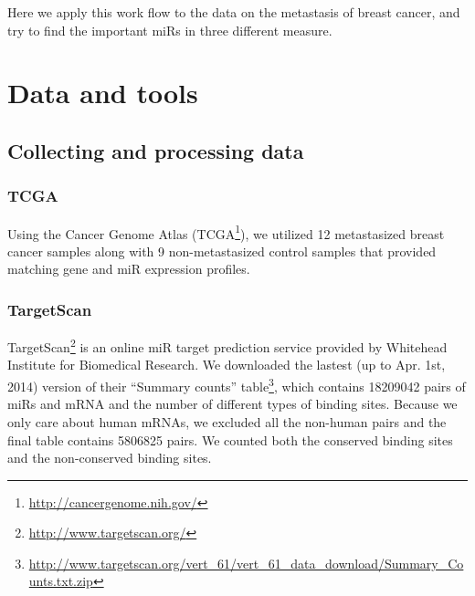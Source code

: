 \documentclass{scrartcl}
\numberwithin{figure}{section}
\numberwithin{table}{section}
\begin{document}
Here we apply this work flow to the data on the metastasis of breast cancer,
and try to find the important miRs in three different measure.

\section{Data and tools}

\subsection{Collecting and processing data}

\subsubsection{TCGA}


Using the Cancer Genome Atlas
(TCGA\footnote{\url{http://cancergenome.nih.gov/}}), we utilized 12
metastasized breast cancer samples along with 9 non-metastasized control
samples that provided matching gene and miR expression profiles.


\subsubsection{TargetScan}

TargetScan\footnote{\url{http://www.targetscan.org/}} is an online miR target
prediction service provided by Whitehead Institute for Biomedical Research. We
downloaded the lastest (up to Apr. 1st, 2014) version of their ``Summary
counts''
table\footnote{\url{http://www.targetscan.org/vert\_61/vert\_61\_data\_download/Summary\_Counts.txt.zip}},
which contains 18209042 pairs of miRs and mRNA and the number of different
types of binding sites. Because we only care about human mRNAs, we excluded all
the non-human pairs and the final table contains 5806825 pairs. We counted both
the conserved binding sites and the non-conserved binding sites.
\end{document}
